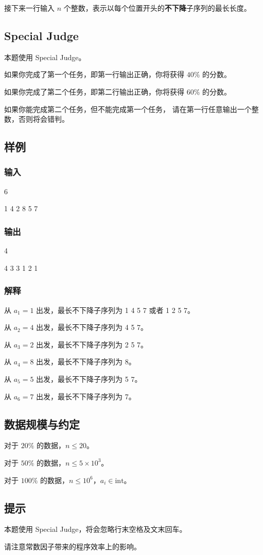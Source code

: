 \documentclass[UTF8]{article}
\begin{document}
	接下来一行输入 $n$ 个整数，表示以每个位置开头的\textbf{不下降}子序列的最长长度。

	\subsection{Special Judge}
	本题使用 Special Judge。

	如果你完成了第一个任务，即第一行输出正确，你将获得 $40\%$ 的分数。

	如果你完成了第二个任务，即第二行输出正确，你将获得 $60\%$ 的分数。

	如果你能完成第二个任务，但不能完成第一个任务，
	请在第一行任意输出一个整数，否则将会错判。

	\subsection{样例}
	
	\subsubsection{输入}
	6

	1 4 2 8 5 7

	\subsubsection{输出}
	4

	4 3 3 1 2 1

	\subsubsection{解释}
	从 $a_1 = 1$ 出发，最长不下降子序列为 1 4 5 7 或者 1 2 5 7。
	
	从 $a_2 = 4$ 出发，最长不下降子序列为 4 5 7。
	
	从 $a_3 = 2$ 出发，最长不下降子序列为 2 5 7。

	从 $a_4 = 8$ 出发，最长不下降子序列为 8。

	从 $a_5 = 5$ 出发，最长不下降子序列为 5 7。

	从 $a_6 = 7$ 出发，最长不下降子序列为 7。

	\subsection{数据规模与约定}
	对于 $20\%$ 的数据，$n \le 20$。

	对于 $50\%$ 的数据，$n \le 5 × 10^3$。

	对于 $100\%$ 的数据，$n \le 10^6$，$a_i \in \mathrm{int}$。

	\subsection{提示}
	本题使用 Special Judge，将会忽略行末空格及文末回车。

	请注意常数因子带来的程序效率上的影响。
\end{document}
